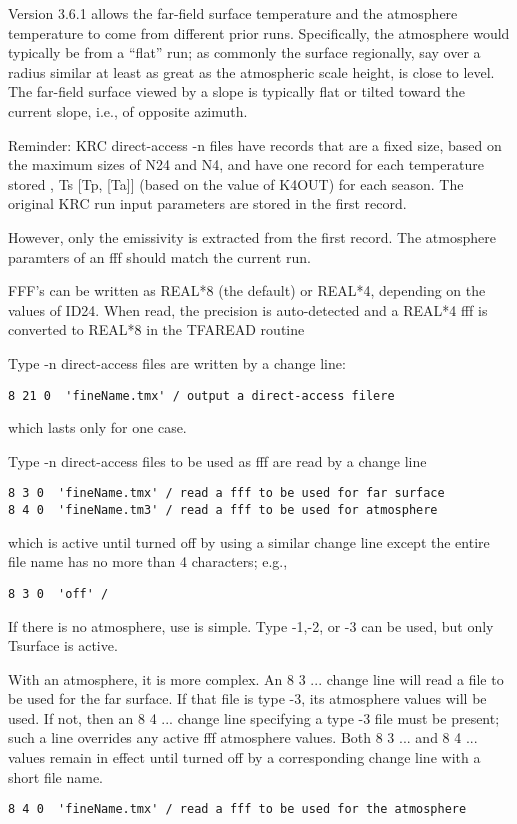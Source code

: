 \documentclass{article}
\begin{document}
Version 3.6.1 allows the far-field surface temperature and the atmosphere
temperature to come from different prior runs. Specifically, the atmosphere
would typically be from a ``flat'' run; as commonly the surface regionally, say
over a radius similar at least as great as the atmospheric scale height, is
close to level. The far-field surface viewed by a slope is typically flat or
tilted toward the current slope, i.e., of opposite azimuth.

Reminder: KRC direct-access -n files have records that are a fixed size, based
on the maximum sizes of N24 and N4, and have one record for each temperature
stored , Ts [Tp, [Ta]] (based on the value of K4OUT) for each season.  The
original KRC run input parameters are stored in the first record.

However, only the emissivity is extracted from the first record. The atmosphere
paramters of an fff should match the current run.

FFF's can be written as REAL*8 (the default) or REAL*4, depending on the values
of ID24. When read, the precision is auto-detected and a REAL*4 fff is converted
to REAL*8 in the TFAREAD routine



Type -n direct-access files are written by a change line:
\vspace{-4.mm} 
\begin{verbatim}
8 21 0  'fineName.tmx' / output a direct-access filere
\end{verbatim}
\vspace{-4.mm} 
which lasts only for one case.

Type -n direct-access files to be used as fff are read by a change line
\vspace{-4.mm} 
\begin{verbatim}
8 3 0  'fineName.tmx' / read a fff to be used for far surface
8 4 0  'fineName.tm3' / read a fff to be used for atmosphere
\end{verbatim}
\vspace{-4.mm} 
which is active until turned off by using a similar change line except the entire file name has no more than 4 characters; e.g.,
\vspace{-4.mm} 
\begin{verbatim}
8 3 0  'off' / 
\end{verbatim}

If there is no atmosphere, use is simple. Type -1,-2, or -3 can be used, but only Tsurface is active.

With an atmosphere, it is more complex. An 8 3 ... change line will read a file
to be used for the far surface. If that file is type -3, its atmosphere values
will be used. If not, then an 8 4 ... change line specifying a type -3 file must
be present; such a line overrides any active fff atmosphere values.  Both 8 3 ... and 8 4 ... values remain in effect until turned off by
a corresponding change line with a short file name.
\vspace{-3.mm} 
\begin{verbatim}
8 4 0  'fineName.tmx' / read a fff to be used for the atmosphere
\end{verbatim}
\end{document}
